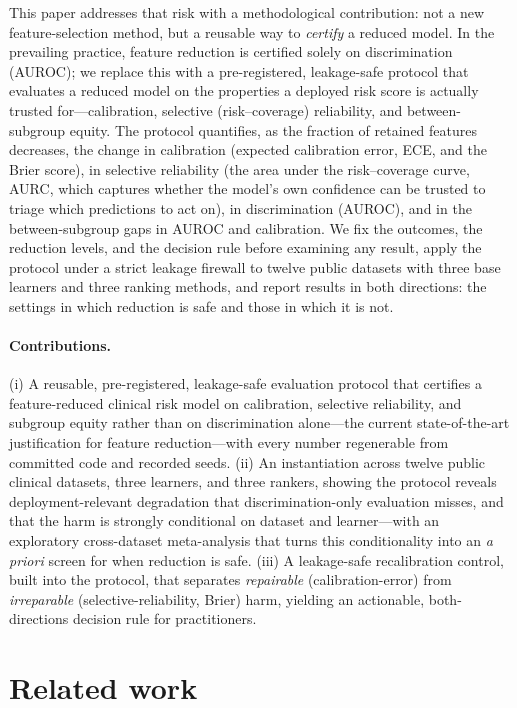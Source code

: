 \documentclass[fleqn,10pt]{wlscirep}
\begin{document}
This paper addresses that risk with a methodological contribution: not a new feature-selection
method, but a reusable way to \emph{certify} a reduced model. In the prevailing practice, feature
reduction is certified solely on discrimination (AUROC); we replace this with a pre-registered,
leakage-safe protocol that evaluates a reduced model on the properties a deployed risk score is
actually trusted for---calibration, selective (risk--coverage) reliability, and between-subgroup
equity. The protocol quantifies, as the fraction of retained features decreases, the change in
calibration (expected calibration error, ECE, and the Brier score), in selective reliability (the area
under the risk--coverage curve, AURC, which captures whether the model's own confidence can be trusted
to triage which predictions to act on), in discrimination (AUROC), and in the between-subgroup gaps in
AUROC and calibration. We fix the outcomes, the reduction levels, and the decision rule before
examining any result, apply the protocol under a strict leakage firewall to twelve public datasets with
three base learners and three ranking methods, and report results in both directions: the settings in
which reduction is safe and those in which it is not.

\paragraph{Contributions.}
(i) A reusable, pre-registered, leakage-safe evaluation protocol that certifies a feature-reduced
clinical risk model on calibration, selective reliability, and subgroup equity rather than on
discrimination alone---the current state-of-the-art justification for feature reduction---with every
number regenerable from committed code and recorded seeds. (ii) An instantiation across twelve public
clinical datasets, three learners, and three rankers, showing the protocol reveals deployment-relevant
degradation that discrimination-only evaluation misses, and that the harm is strongly conditional on
dataset and learner---with an exploratory cross-dataset meta-analysis that turns this conditionality
into an \emph{a priori} screen for when reduction is safe. (iii) A leakage-safe recalibration control, built into the protocol, that
separates \emph{repairable} (calibration-error) from \emph{irreparable} (selective-reliability,
Brier) harm, yielding an actionable, both-directions decision rule for practitioners.

\section{Related work}
\label{sec:related}
\end{document}
